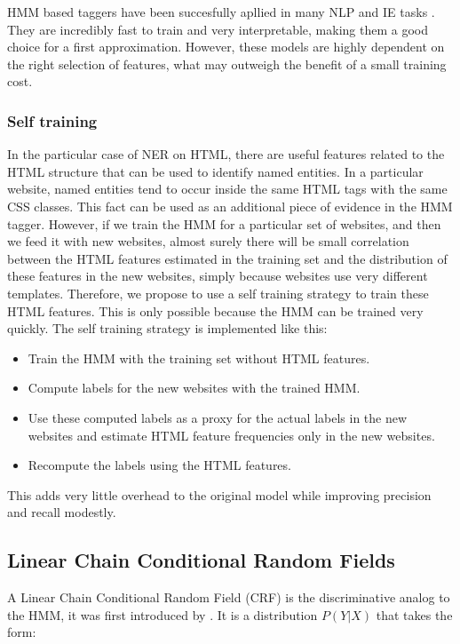 \documentclass[sigconf]{acmart}
\begin{document}
HMM based taggers have been succesfully apllied in many NLP and IE tasks 
\cite{Rabiner1989, Leek1997, Freitag2000}. They are incredibly fast to train and very 
interpretable, making them a good choice for a first approximation. However, these models 
are highly dependent on the right selection of features, what may outweigh the benefit of a 
small training cost.

\subsubsection{Self training} \label{sssec:self_training}

In the particular case of NER on HTML, there are useful features related to the HTML
structure that can be used to identify named entities. In a particular website, named
entities tend to occur inside the same HTML tags with the same CSS classes. This fact
can be used as an additional piece of evidence in the HMM tagger. However, if we train 
the HMM for a particular set of websites, and then we feed it with new websites, almost 
surely there will be small correlation between the HTML features estimated in the training 
set and the distribution of these features in the new websites, simply because websites 
use very different templates. Therefore, we propose to use a self training strategy to train 
these HTML features. This is only possible because the HMM can be trained very quickly. The 
self training strategy is implemented like this:

\begin{itemize}
\item Train the HMM with the training set without HTML features.
\item Compute labels for the new websites with the trained HMM.
\item Use these computed labels as a proxy for the actual labels in the 
new websites and estimate HTML feature frequencies only in the new websites.
\item Recompute the labels using the HTML features.
\end{itemize}

This adds very little overhead to the original model while improving precision and recall
modestly.

\subsection{Linear Chain Conditional Random Fields}

A Linear Chain Conditional Random Field (CRF) is the discriminative analog to the HMM,
it was first introduced by \cite{Lafferty2001}. It is a distribution $ P(Y|X) $ that takes the form:
\end{document}
